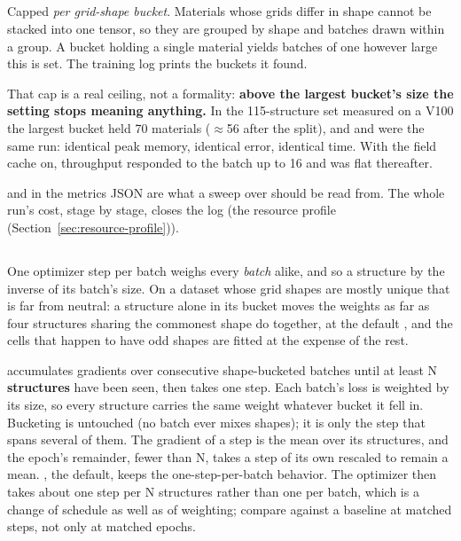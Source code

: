 \subsection{}

Capped \emph{per grid-shape bucket}. Materials whose grids differ in shape cannot be stacked into one tensor, so they are grouped by shape and batches drawn within a group. A bucket holding a single material yields batches of one however large this is set. The training log prints the buckets it found.

That cap is a real ceiling, not a formality: \textbf{above the largest bucket's size the setting stops meaning anything.} In the 115-structure set measured on a V100 the largest bucket held 70 materials ($\approx$56 after the split), and  and  were the same run: identical peak memory, identical error, identical time. With the field cache on, throughput responded to the batch up to 16 and was flat thereafter.

 and  in the metrics JSON are what a sweep over  should be read from. The whole run's cost, stage by stage, closes the log (the resource profile (Section~\ref{sec:resource-profile})).

\subsection{}

One optimizer step per batch weighs every \emph{batch} alike, and so a structure by the inverse of its batch's size. On a dataset whose grid shapes are mostly unique that is far from neutral: a structure alone in its bucket moves the weights as far as four structures sharing the commonest shape do together, at the default , and the cells that happen to have odd shapes are fitted at the expense of the rest.

 accumulates gradients over consecutive shape-bucketed batches until at least N \textbf{structures} have been seen, then takes one step. Each batch's loss is weighted by its size, so every structure carries the same weight whatever bucket it fell in. Bucketing is untouched (no batch ever mixes shapes); it is only the step that spans several of them. The gradient of a step is the mean over its structures, and the epoch's remainder, fewer than N, takes a step of its own rescaled to remain a mean. , the default, keeps the one-step-per-batch behavior. The optimizer then takes about one step per N structures rather than one per batch, which is a change of schedule as well as of weighting; compare against a baseline at matched steps, not only at matched epochs.

